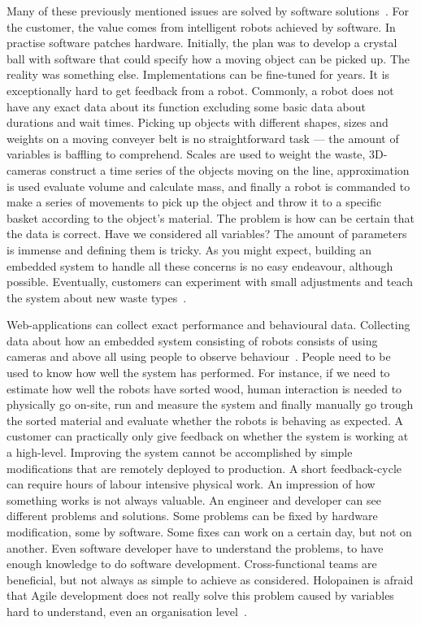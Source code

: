 \documentclass[english]{tktltiki2}
\begin{document}
Many of these previously mentioned issues are solved by software solutions~\cite{Hol15a}. For the customer, the value comes from intelligent robots achieved by software. In practise software patches hardware. Initially, the plan was to develop a crystal ball with software that could specify how a moving object can be picked up. The reality was something else. Implementations can be fine-tuned for years. It is exceptionally hard to get feedback from a robot. Commonly, a robot does not have any exact data about its function excluding some basic data about durations and wait times. Picking up objects with different shapes, sizes and weights on a moving conveyer belt is no straightforward task — the amount of variables is baffling to comprehend. Scales are used to weight the waste, 3D-cameras construct a time series of the objects moving on the line, approximation is used evaluate volume and calculate mass, and finally a robot is commanded to make a series of movements to pick up the object and throw it to a specific basket according to the object’s material. The problem is how can be certain that the data is correct. Have we considered all variables? The amount of parameters is immense and defining them is tricky. As you might expect, building an embedded system to handle all these concerns is no easy endeavour, although possible. Eventually, customers can experiment with small adjustments and teach the system about new waste types~\cite{Hol15a}.

Web-applications can collect exact performance and behavioural data. Collecting data about how an embedded system consisting of robots consists of using cameras and above all using people to observe behaviour~\cite{Hol15a}. People need to be used to know how well the system has performed. For instance, if we need to estimate how well the robots have sorted wood, human interaction is needed to physically go on-site, run and measure the system and finally manually go trough the sorted material and evaluate whether the robots is behaving as expected. A customer can practically only give feedback on whether the system is working at a high-level. Improving the system cannot be accomplished by simple modifications that are remotely deployed to production. A short feedback-cycle can require hours of labour intensive physical work. An impression of how something works is not always valuable. An engineer and developer can see different problems and solutions. Some problems can be fixed by hardware modification, some by software. Some fixes can work on a certain day, but not on another. Even software developer have to understand the problems, to have enough knowledge to do software development. Cross-functional teams are beneficial, but not always as simple to achieve as considered. Holopainen is afraid that Agile development does not really solve this problem caused by variables hard to understand, even an organisation level~\cite{Hol15a}.
\end{document}
